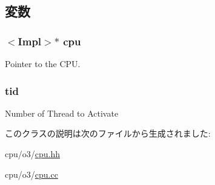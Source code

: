 \subsection{変数}
\hypertarget{classFullO3CPU_1_1ActivateThreadEvent_a3a3767255bcefd2ce55f94976ab8eb99}{
\subsubsection[{cpu}]{$<$Impl$>$$\ast$ {\bf cpu}}}
\label{classFullO3CPU_1_1ActivateThreadEvent_a3a3767255bcefd2ce55f94976ab8eb99}
Pointer to the CPU. \hypertarget{classFullO3CPU_1_1ActivateThreadEvent_aa508770268ee4ceaf16054b9e0be0e17}{
\subsubsection[{tid}]{ {\bf tid}}}
\label{classFullO3CPU_1_1ActivateThreadEvent_aa508770268ee4ceaf16054b9e0be0e17}
Number of Thread to Activate 

このクラスの説明は次のファイルから生成されました:\begin{DoxyCompactItemize}
\item 
cpu/o3/\hyperlink{o3_2cpu_8hh}{cpu.hh}\item 
cpu/o3/\hyperlink{o3_2cpu_8cc}{cpu.cc}\end{DoxyCompactItemize}
